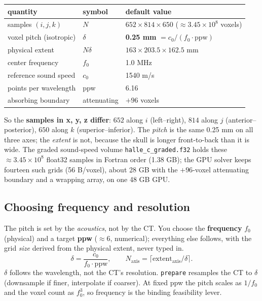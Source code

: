 \documentclass[10pt]{article}
\newcommand{\code}[1]{\lstinline[basicstyle=\ttfamily]|#1|}
\begin{document}
\begin{center}\small
\begin{tabular}{@{}lll@{}}
\toprule
quantity & symbol & default value \\
\midrule
samples $(i,j,k)$ & $N$ & \textbf{$652\times814\times650$}  ($\approx3.45\times10^{8}$ voxels) \\
voxel pitch (isotropic) & $\delta$ & \textbf{0.25 mm} $= c_0/(f_0\cdot\mathrm{ppw})$ \\
physical extent & $N\delta$ & $163\times203.5\times162.5$ mm \\
center frequency & $f_0$ & 1.0 MHz \\
reference sound speed & $c_0$ & 1540 m/s \\
points per wavelength & ppw & 6.16 \\
absorbing boundary & attenuating & $+96$ voxels \\
\bottomrule
\end{tabular}
\end{center}

So the \textbf{samples in x, y, z differ}: $652$ along $i$ (left--right), $814$ along
$j$ (anterior--posterior), $650$ along $k$ (superior--inferior). The \emph{pitch} is the
same 0.25 mm on all three axes; the \emph{extent} is not, because the skull is longer
front-to-back than it is wide. The graded sound-speed volume \code{halle_c_graded.f32}
holds these $\approx3.45\times10^{8}$ float32 samples in Fortran order (1.38 GB); the
GPU solver keeps fourteen such grids (56 B/voxel), about 28 GB with the $+96$-voxel
attenuating boundary and a wrapping array, on one 48 GB GPU.

\subsection{Choosing frequency and resolution}

The pitch is set by the \emph{acoustics}, not by the CT. You choose the
\textbf{frequency} $f_0$ (physical) and a target \textbf{ppw} ($\approx 6$, numerical);
everything else follows, with the grid \emph{size} derived from the physical extent,
never typed in.
\[
\delta = \frac{c_0}{f_0\cdot\mathrm{ppw}}, \qquad
N_\text{axis} = \big\lceil \mathrm{extent}_\text{axis}/\delta \big\rceil .
\]
$\delta$ follows the wavelength, not the CT's resolution. \code{prepare} resamples the
CT to $\delta$ (downsample if finer, interpolate if coarser). At fixed ppw the pitch
scales as $1/f_0$ and the voxel count as $f_0^3$, so frequency is the binding
feasibility lever.
\end{document}
